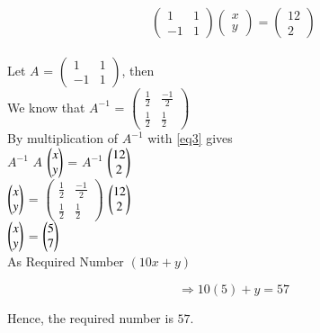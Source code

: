 \documentclass[journal,12pt,twocolumn]{IEEEtran}
\begin{document}
 
 \begin{equation}
     \begin{pmatrix}
1 & 1 \\
-1 & 1
\end{pmatrix}
\begin{pmatrix}
x \\
y
\end{pmatrix} = 
\begin{pmatrix}
12 \\
2
\end{pmatrix}\label{eq3}
 \end{equation} \\


Let $A$ = 
$\begin{pmatrix}
1 & 1 \\
-1 & 1
\end{pmatrix}$, then \\

We know that
     $A^{-1}$ = 
     $\begin{pmatrix}
    \frac{1}{2} & \frac{-1}{2} \\
    \frac{1}{2} & \frac{1}{2}    
    \end{pmatrix}$ \\
By multiplication of $A^{-1}$ with \ref{eq3} gives \\
 
      $A^{-1}$ $A$ $\begin{pmatrix}x \\ y\end{pmatrix}$ = $A^{-1}$ $\begin{pmatrix}12 \\ 2\end{pmatrix}$ \\
      $\begin{pmatrix}x \\ y\end{pmatrix}$ =
      $\begin{pmatrix}
    \frac{1}{2} & \frac{-1}{2} \\
    \frac{1}{2} & \frac{1}{2}    
    \end{pmatrix}$ $\begin{pmatrix}12 \\ 2\end{pmatrix}$\\
   $\begin{pmatrix}x \\ y\end{pmatrix}$ = $\begin{pmatrix}5 \\ 7\end{pmatrix}$ \\
    
    As Required Number $(10x+y)$

\begin{equation*}
    \Rightarrow 10(5)+y=57
\end{equation*}

    Hence, the required number is $57$.
\end{document}
